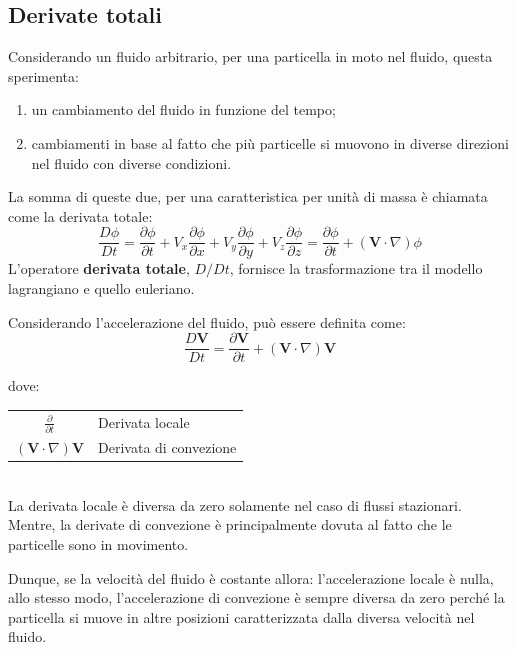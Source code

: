 \subsection{Derivate totali}
Considerando un fluido arbitrario, per una particella in moto nel fluido, questa sperimenta:
\begin{enumerate}
\item un cambiamento del fluido in funzione del tempo;
\item cambiamenti in base al fatto che più particelle si muovono in diverse direzioni nel fluido con diverse condizioni.
\end{enumerate}
La somma di queste due, per una caratteristica per unità di massa è chiamata come la derivata totale:
\begin{equation}
\frac{D\phi}{Dt} = \frac{\partial \phi}{\partial t} + V_x \frac{\partial \phi}{\partial x} + V_y \frac{\partial \phi}{\partial y} + V_z \frac{\partial \phi}{\partial z} = \frac{\partial \phi}{\partial t} + (\textbf{V} \cdot \nabla)\phi
\label{eqn:DerivataTotale}
\end{equation}
L'operatore \textbf{derivata totale}, $D/Dt$, fornisce la trasformazione tra il modello lagrangiano e quello euleriano.

Considerando l'accelerazione del fluido, può essere definita come:
\begin{equation}
\frac{D\mathbf{V}}{Dt} = \frac{\partial \mathbf{V}}{\partial t} + (\mathbf{V}\cdot \nabla) \mathbf{V}
\label{eqn:Accelerazione}
\end{equation}

dove:\\
\begin{tabular}{cl}
$\frac{\partial}{\partial t}$ & Derivata locale\\
$(\mathbf{V} \cdot \nabla) \mathbf{V}$ & Derivata di convezione\\
\end{tabular}\\

La derivata locale è diversa da zero solamente nel caso di flussi stazionari.
Mentre, la derivate di convezione è principalmente dovuta al fatto che le particelle sono in movimento.

Dunque, se la velocità del fluido è costante allora: l'accelerazione locale è nulla, allo stesso modo, l'accelerazione di convezione è sempre diversa da zero perché la particella si muove in altre posizioni caratterizzata dalla diversa velocità nel fluido.

